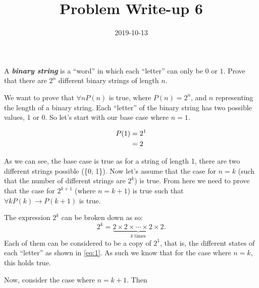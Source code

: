 \documentclass[a4paper,12pt]{article}
\title{Problem Write-up 6}
\date{2019-10-13}
\begin{document}
    \begin{problem}
        A \textbf{\textit{binary string}} is a “word” in which each “letter” can only be \(0\) or \(1\). Prove that there are \(2^n\) different binary strings of length \(n\).
    \end{problem}
    \begin{answer}
        We want to prove that \(\forall n P(n)\) is true, where \(P(n) = 2^n\), and \(n\) representing the length of a binary string. Each “letter” of the binary string has two possible values, 1 or 0. So let's start with our base case where \(n = 1\).
        
        \begin{align} \label{eq:1}
            P(1) &= 2^1 \notag \\
            &= 2
    	\end{align}
       
        As we can see, the base case is true as for a string of length 1, there are two different strings possible (\{0, 1\}). Now let's assume that the case for \(n = k\) (such that the number of different strings are \(2^k\)) is true. From here we need to prove that the case for \(2^{k + 1}\) (where \(n = k + 1\)) is true such that \(\forall k P(k) \rightarrow P(k + 1)\) is true.
        
        The expression \(2^k\) can be broken down as so:
        \begin{equation} \label{eq:2}
            2^k = \underbrace{2 \times 2 \times \dotsb \times 2 \times 2}_{k\ \text{times}}.
        \end{equation}
        Each of them can be considered to be a copy of \(2^1\), that is, the different states of each “letter” as shown in \eqref{eq:1}. As such we know that for the case where \(n = k\), this holds true.

        Now, consider the case where \(n = k + 1\). Then
    \end{answer}
\end{document}

